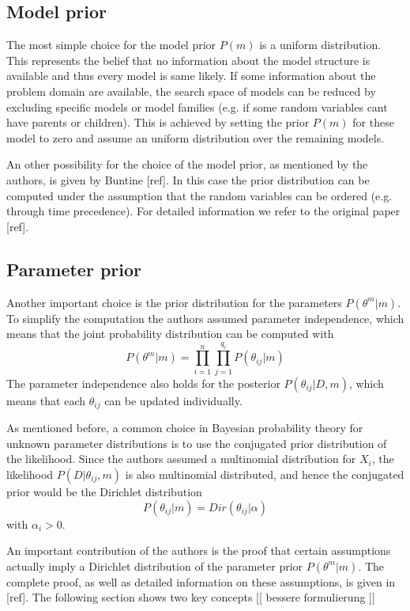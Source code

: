 \documentclass{article}
\begin{document}
	\subsection{Model prior}
	The most simple choice for the model prior $P(m)$ is a uniform distribution. This represents 
	the belief that no information about the model structure is	available and thus every 
	model is same likely. If some information about the problem domain are available, the search space 
	of models can be reduced by excluding specific models or model families (e.g. if some random
	variables cant have parents or children). This is achieved by setting
	the prior $P(m)$ for these model to zero and assume an uniform distribution over the remaining
	models.	
	
	An other possibility for the choice of the model prior, as mentioned by the authors, is given
	by Buntine [ref]. In this case the prior distribution can be computed under the assumption that
	the random variables can be ordered (e.g. through time precedence). For detailed information we
	refer to the original paper [ref].
	
	\subsection{Parameter prior}
	Another important choice is the prior distribution for the parameters $P(\theta^m|m)$. To simplify
	the computation the authors assumed parameter independence, which means that the joint probability
	distribution can be computed with
	\[
		P(\theta^m|m)= \prod_{i=1}^n \prod_{j=1}^{q_i} P(\theta_{ij}|m)
	\]
	The parameter independence also holds for the posterior $P(\theta_{ij}|D,m)$, which means
	that each $\theta_{ij}$ can be updated individually.
	
	As mentioned before, a common choice in Bayesian probability theory for unknown parameter distributions
	is to use the conjugated prior distribution of the likelihood.
	Since the authors assumed a multinomial distribution
	for $X_i$, the likelihood $P(D|\theta_{ij},m)$ is also multinomial distributed, and hence the
	conjugated prior would be the Dirichlet distribution
	\[
		P(\theta_{ij}|m) = Dir(\theta_{ij}|\alpha)
	\]
	with $\alpha_i > 0$.
	
	An important contribution of the authors is the proof that certain assumptions actually 
	imply a Dirichlet distribution of the parameter prior $P(\theta^m|m)$.
	The complete proof, as well as detailed information on these assumptions, is given in [ref].
	The following section shows two key concepts [[ bessere formulierung ]]
	
\end{document}
